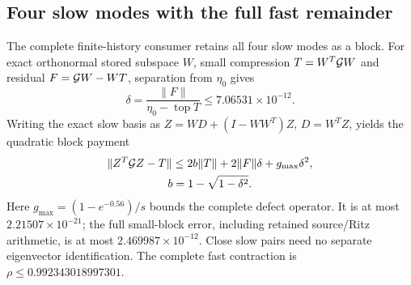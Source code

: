 \subsection{Four slow modes with the full fast remainder}

The complete finite-history consumer retains all four slow modes as a
block. For exact orthonormal stored subspace \(W\), small compression
\(T=W^T{\cal G}W\) and residual \(F={\cal G}W-WT\), separation from
\(\eta_0\) gives
\[
 \delta=\frac{\|F\|}{\eta_0-\operatorname{top}T}
          \leq7.06531\times10^{-12}.
\]
Writing the exact slow basis as \(Z=WD+(I-WW^T)Z\), \(D=W^TZ\),
yields the quadratic
block payment
\[
\begin{gathered}
\|Z^T{\cal G}Z-T\|
 \leq2b\|T\|+2\|F\|\delta+g_{\max}\delta^2,\\
b=1-\sqrt{1-\delta^2}.
\end{gathered}
\]
Here \(g_{\max}=(1-e^{-0.56})/s\) bounds the complete defect operator.
It is at most \(2.21507\times10^{-21}\); the full small-block error,
including retained source/Ritz arithmetic, is at most
\(2.469987\times10^{-12}\). Close slow pairs need no separate
eigenvector identification. The complete fast contraction is
\(\rho\leq0.992343018997301\).

